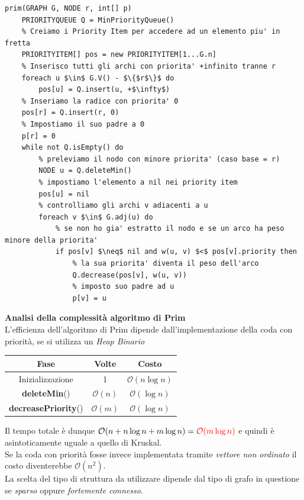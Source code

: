 \documentclass[../cheatSheetAlgoritmi.tex]{subfiles}
\begin{document}
\begin{lstlisting}[caption=Albero di Copertura di Peso Minimo - Prim]
prim(GRAPH G, NODE r, int[] p)
	PRIORITYQUEUE Q = MinPriorityQueue()
	% Creiamo i Priority Item per accedere ad un elemento piu' in fretta
	PRIORITYITEM[] pos = new PRIORITYITEM[1...G.n]
	% Inserisco tutti gli archi con priorita' +infinito tranne r
	foreach u $\in$ G.V() - $\{$r$\}$ do
		pos[u] = Q.insert(u, +$\infty$)
	% Inseriamo la radice con priorita' 0
	pos[r] = Q.insert(r, 0)
	% Impostiamo il suo padre a 0
	p[r] = 0
	while not Q.isEmpty() do
		% preleviamo il nodo con minore priorita' (caso base = r)
		NODE u = Q.deleteMin()
		% impostiamo l'elemento a nil nei priority item
		pos[u] = nil
		% controlliamo gli archi v adiacenti a u
		foreach v $\in$ G.adj(u) do
			% se non ho gia' estratto il nodo e se un arco ha peso minore della priorita' 
			if pos[v] $\neq$ nil and w(u, v) $<$ pos[v].priority then
				% la sua priorita' diventa il peso dell'arco
				Q.decrease(pos[v], w(u, v))
				% imposto suo padre ad u
				p[v] = u
\end{lstlisting}
\textbf{Analisi della complessità algoritmo di Prim}\\
L'efficienza dell'algoritmo di Prim dipende dall'implementazione della coda con priorità, se si utilizza un \emph{Heap Binario}
\begin{center}
	\renewcommand{\arraystretch}{1.2}
	\begin{tabular}{ |c|c|c| } 
		\hline
			\textbf{Fase} & \textbf{Volte} & \textbf{Costo}\\ 
		\hline
			Inizializzazione & 1 &  $\mathcal{O}(n \log n)$\\ 
		\hline
			\textbf{deleteMin}() & $\mathcal{O}(n)$ &  $\mathcal{O}(\log n)$ \\
		\hline
			\textbf{decreasePriority}() & $\mathcal{O}(m)$ & $\mathcal{O}(\log n)$\\
		\hline
	\end{tabular}
\end{center}
Il tempo totale è dunque $\mathcal{O}(n + n \log n + m \log n) = \textcolor{red}{\mathcal{O}(m \log n)}$ e quindi è asintoticamente uguale a quello di Kruskal.\\
Se la coda con priorità fosse invece implementata tramite \emph{vettore non ordinato} il costo diventerebbe $\mathcal{O}(n^{2})$.\\
La scelta del tipo di struttura da utilizzare dipende dal tipo di grafo in questione se \emph{sparso} oppure \emph{fortemente connesso}.\\\\
\end{document}
